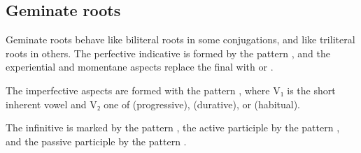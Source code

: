 \documentclass[grammar]{subfiles}
\begin{document}
\subsection{Geminate roots}
\label{ssec:vm:ii_geminate_roots}

Geminate roots behave like biliteral roots in some conjugations, and like
triliteral roots in others.  The perfective indicative is formed by the pattern
, and the experiential and momentane aspects replace the final
 with  or .

The imperfective aspects are formed with the pattern ,
where V₁ is the short inherent vowel and V₂ one of  (progressive),
 (durative), or  (habitual).

The infinitive is marked by the pattern , the active participle
by the pattern , and the passive participle by the pattern
.  


\end{document}
